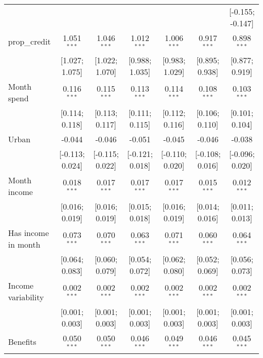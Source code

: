 \begin{table}[htbp]
\begin{threeparttable}[b]
\begin{tabular}{lcccccc}
                                        &                  &                 &                 &                  &                  & [-0.155; -0.147]\\   
         prop\_credit                   & 1.051$^{***}$    & 1.046$^{***}$   & 1.012$^{***}$   & 1.006$^{***}$    & 0.917$^{***}$    & 0.898$^{***}$\\   
                                        & [1.027; 1.075]   & [1.022; 1.070]  & [0.988; 1.035]  & [0.983; 1.029]   & [0.895; 0.938]   & [0.877; 0.919]\\   
         Month spend                    & 0.116$^{***}$    & 0.115$^{***}$   & 0.113$^{***}$   & 0.114$^{***}$    & 0.108$^{***}$    & 0.103$^{***}$\\   
                                        & [0.114; 0.118]   & [0.113; 0.117]  & [0.111; 0.115]  & [0.112; 0.116]   & [0.106; 0.110]   & [0.101; 0.104]\\   
         Urban                          & -0.044           & -0.046          & -0.051          & -0.045           & -0.046           & -0.038\\   
                                        & [-0.113; 0.024]  & [-0.115; 0.022] & [-0.121; 0.018] & [-0.110; 0.020]  & [-0.108; 0.016]  & [-0.096; 0.020]\\   
         Month income                   & 0.018$^{***}$    & 0.017$^{***}$   & 0.017$^{***}$   & 0.017$^{***}$    & 0.015$^{***}$    & 0.012$^{***}$\\   
                                        & [0.016; 0.019]   & [0.016; 0.019]  & [0.015; 0.018]  & [0.016; 0.019]   & [0.014; 0.016]   & [0.011; 0.013]\\   
         Has income in month            & 0.073$^{***}$    & 0.070$^{***}$   & 0.063$^{***}$   & 0.071$^{***}$    & 0.060$^{***}$    & 0.064$^{***}$\\   
                                        & [0.064; 0.083]   & [0.060; 0.079]  & [0.054; 0.072]  & [0.062; 0.080]   & [0.052; 0.069]   & [0.056; 0.073]\\   
         Income variability             & 0.002$^{***}$    & 0.002$^{***}$   & 0.002$^{***}$   & 0.002$^{***}$    & 0.002$^{***}$    & 0.002$^{***}$\\   
                                        & [0.001; 0.003]   & [0.001; 0.003]  & [0.001; 0.003]  & [0.001; 0.003]   & [0.001; 0.003]   & [0.001; 0.003]\\   
         Benefits                       & 0.050$^{***}$    & 0.050$^{***}$   & 0.046$^{***}$   & 0.049$^{***}$    & 0.046$^{***}$    & 0.045$^{***}$\\   

\end{tabular}
\end{threeparttable}
\end{table}

